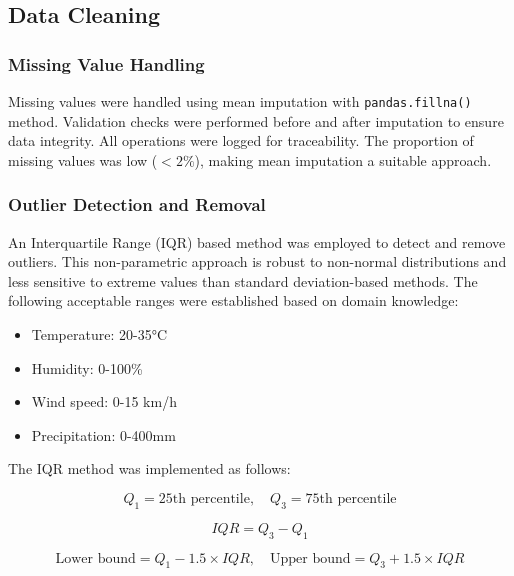 \documentclass[12pt]{article}
\begin{document}
\subsection{Data Cleaning}
\label{subsec:data_cleaning}

\subsubsection{Missing Value Handling}
\label{subsubsec:missing_values}

Missing values were handled using mean imputation with \texttt{pandas.fillna()} method. Validation checks were performed before and after imputation to ensure data integrity. All operations were logged for traceability. The proportion of missing values was low ($<2\%$), making mean imputation a suitable approach.

\subsubsection{Outlier Detection and Removal}
\label{subsubsec:outlier_detection}

An Interquartile Range (IQR) based method was employed to detect and remove outliers. This non-parametric approach is robust to non-normal distributions and less sensitive to extreme values than standard deviation-based methods. The following acceptable ranges were established based on domain knowledge:

\begin{itemize}
    \item Temperature: 20-35°C
    \item Humidity: 0-100\%
    \item Wind speed: 0-15 km/h
    \item Precipitation: 0-400mm
\end{itemize}

The IQR method was implemented as follows:

\begin{equation}
Q_1 = \text{25th percentile}, \quad Q_3 = \text{75th percentile}
\end{equation}

\begin{equation}
IQR = Q_3 - Q_1
\end{equation}

\begin{equation}
\text{Lower bound} = Q_1 - 1.5 \times IQR, \quad \text{Upper bound} = Q_3 + 1.5 \times IQR
\end{equation}
\end{document}
